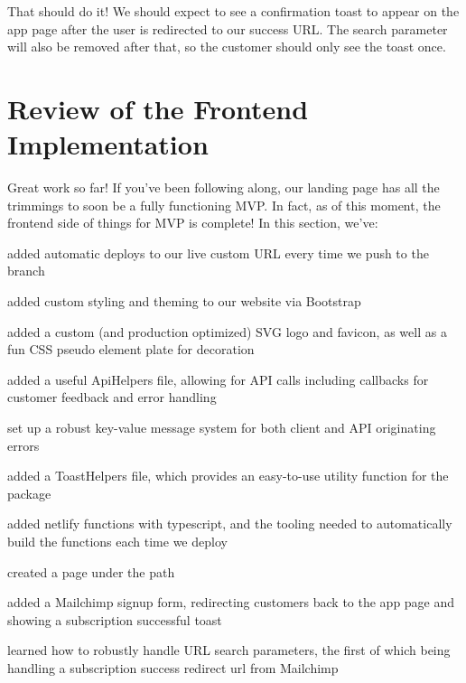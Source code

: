 \documentclass[paper=6in:9in,pagesize=pdftex,headinclude=on,footinclude=on,12pt,twoside]{scrbook}
\begin{document}
That should do it! We should expect to see a confirmation toast to appear on the app page after the user is redirected to our success URL. The search parameter will also be removed after that, so the customer should only see the toast once.

\begin{arrows}
  \item 
\end{arrows}


\section{Review of the Frontend Implementation}

Great work so far! If you've been following along, our landing page has all the trimmings to soon be a fully functioning MVP. In fact, as of this moment, the frontend side of things for MVP is complete! In this section, we've: 

\begin{arrows}
\item added automatic deploys to our live custom URL every time we push to the  branch
\item added custom styling and theming to our website via Bootstrap
\item added a custom (and production optimized) SVG logo and favicon, as well as a fun CSS pseudo element plate for decoration
\item added a useful ApiHelpers file, allowing for API calls including callbacks for customer feedback and error handling
\item set up a robust key-value message system for both client and API originating errors
\item added a ToastHelpers file, which provides an easy-to-use utility function for the  package
\item added netlify functions with typescript, and the tooling needed to automatically build the functions each time we deploy
\item created a page under the  path
\item added a Mailchimp signup form, redirecting customers back to the app page and showing a subscription successful toast
\item learned how to robustly handle URL search parameters, the first of which being handling a subscription success redirect url from Mailchimp
\end{arrows}
\end{document}
